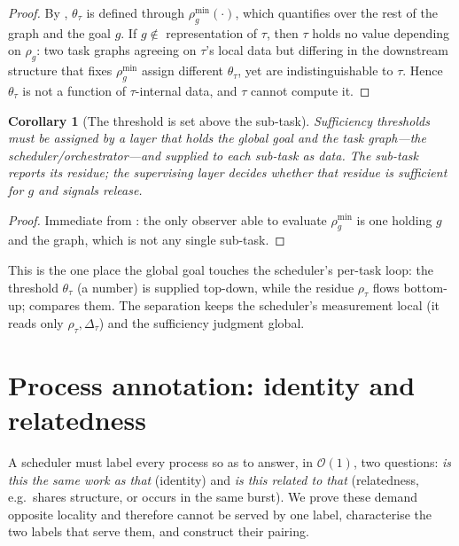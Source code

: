 \documentclass[twocolumn,10pt,a4paper]{article}
\theoremstyle{thmstyle}
\newtheorem{corollary}[theorem]{Corollary}
\theoremstyle{definition}
\theoremstyle{remark}
\newcommand{\res}{\rho}
\newcommand{\task}{\tau}
\begin{document}
\begin{proof}
By , $\theta_\task$ is defined through
$\res_g^{\min}(\cdot)$, which quantifies over the rest of the graph and
the goal $g$. If $g\notin$ representation of $\task$, then $\task$ holds
no value depending on $\res_g$: two task graphs agreeing on $\task$'s
local data but differing in the downstream structure that fixes
$\res_g^{\min}$ assign different $\theta_\task$, yet are indistinguishable
to $\task$. Hence $\theta_\task$ is not a function of $\task$-internal
data, and $\task$ cannot compute it.
\end{proof}

\begin{corollary}[The threshold is set above the sub-task]
\label{cor:above}
Sufficiency thresholds must be assigned by a layer that holds the global
goal and the task graph---the scheduler/orchestrator---and supplied to
each sub-task as data. The sub-task reports its residue; the supervising
layer decides whether that residue is sufficient for $g$ and signals
release.
\end{corollary}

\begin{proof}
Immediate from : the only observer able to evaluate
$\res_g^{\min}$ is one holding $g$ and the graph, which is not any single
sub-task.
\end{proof}

This is the one place the global goal touches the scheduler's per-task
loop: the threshold $\theta_\task$ (a number) is supplied top-down, while
the residue $\res_\task$ flows bottom-up;  compares them.
The separation keeps the scheduler's measurement local (it reads only
$\res_\task,\Delta_\task$) and the sufficiency judgment global.

\section{Process annotation: identity and relatedness}
\label{sec:annotation}

A scheduler must label every process so as to answer, in $\mathcal{O}(1)$,
two questions: \emph{is this the same work as that} (identity) and
\emph{is this related to that} (relatedness, e.g.\ shares structure, or
occurs in the same burst). We prove these demand opposite locality and
therefore cannot be served by one label, characterise the two labels that
serve them, and construct their pairing.
\end{document}
